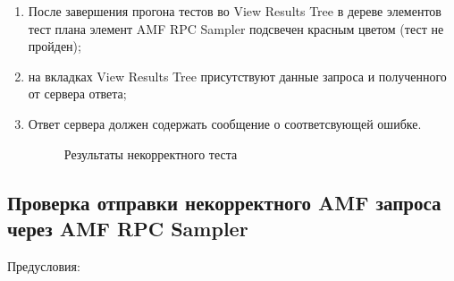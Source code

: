 \begin{enumerate}
\item После завершения прогона тестов во View Results Tree в дереве элементов тест плана элемент AMF RPC Sampler
подсвечен красным цветом (тест не пройден);
\item на вкладках View Results Tree присутствуют данные запроса и полученного от сервера ответа;
\item Ответ сервера должен содержать сообщение о соответсвующей ошибке.

\begin{figure}[ht]
\caption{Результаты некорректного теста}
\label{ris:negativeTest.png}
\end{figure}

\end{enumerate}

\subsection{Проверка отправки некорректного AMF запроса через AMF RPC Sampler}

Предусловия:

